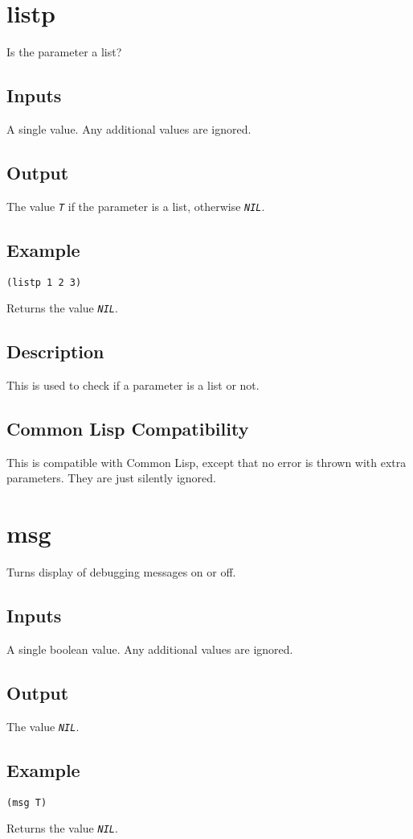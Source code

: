 \documentclass[10pt, openany]{book}
\newcommand{\constant}[1]{\emph{\texttt{#1}}}
\newcommand{\cl}{Common Lisp}
\begin{document}
\section{listp}
Is the parameter a list?
\subsection{Inputs}
A single value.  Any additional values are ignored.
\subsection{Output}
The value \constant{T} if the parameter is a list, otherwise \constant{NIL}.
\subsection{Example}
\begin{lstlisting}
(listp 1 2 3)
\end{lstlisting}
Returns the value \constant{NIL}.
\subsection{Description}
This is used to check if a parameter is a list or not.
\subsection{Common Lisp Compatibility}
This is compatible with \cl, except that no error is thrown with extra parameters.  They are just silently ignored.

\section{msg}
Turns display of debugging messages on or off.
\subsection{Inputs}
A single boolean value.  Any additional values are ignored.
\subsection{Output}
The value \constant{NIL}.
\subsection{Example}
\begin{lstlisting}
(msg T)
\end{lstlisting}
Returns the value \constant{NIL}.
\end{document}
